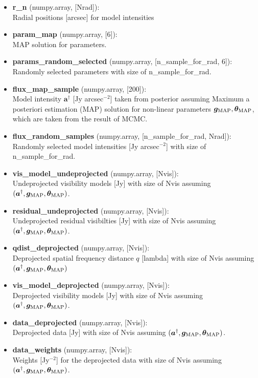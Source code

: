 \documentclass{report}
\begin{document}
\begin{itemize}
    \item \textbf{r\_n}  (numpy.array, [Nrad]): \\ 
    Radial positions  [arcsec] for model intensities 
    \item \textbf{param\_map} (numpy.array, [6]): \\ 
    MAP solution for parameters.
    \item \textbf{params\_random\_selected} (numpy.array, [n\_sample\_for\_rad, 6]): \\ 
    Randomly selected parameters with size of n\_sample\_for\_rad.
    \item \textbf{flux\_map\_sample} (numpy.array, [200]): \\ 
    Model intensity $\bm{a}^{\dagger}$  [Jy arcsec$^{-2}$]  taken from posterior assuming Maximum a posteriori estimation (MAP) solution for non-linear parameters $\bm{g}_{\rm MAP}, \bm{\theta}_{\rm MAP}$, which are taken from the result of MCMC. 
    \item \textbf{flux\_random\_samples} (numpy.array, [n\_sample\_for\_rad, Nrad]): \\ 
    Randomly selected model intensities [Jy arcsec$^{-2}$] with size of n\_sample\_for\_rad.
    \item \textbf{vis\_model\_undeprojected} (numpy.array, [Nvis]): \\ 
    Undeprojected visibility models [Jy] with size of Nvis assuming $(\bm{a}^{\dagger}, \bm{g}_{\rm MAP}, \bm{\theta}_{\rm MAP})$.
    \item \textbf{residual\_undeprojected} (numpy.array, [Nvis]): \\ 
    Undeprojected residual visibilties  [Jy] with size of Nvis   assuming $(\bm{a}^{\dagger}, \bm{g}_{\rm MAP}, \bm{\theta}_{\rm MAP})$.
    \item \textbf{qdist\_deprojected} (numpy.array, [Nvis]): \\ 
    Deprojected spatial frequency distance $q$ [lambda] with size of Nvis  assuming $(\bm{a}^{\dagger}, \bm{g}_{\rm MAP}, \bm{\theta}_{\rm MAP})$
    \item \textbf{vis\_model\_deprojected} (numpy.array, [Nvis]): \\ 
    Deprojected visibility models [Jy] with size of Nvis  assuming $(\bm{a}^{\dagger}, \bm{g}_{\rm MAP}, \bm{\theta}_{\rm MAP})$. 
    \item \textbf{data\_deprojected} (numpy.array, [Nvis]): \\ 
    Deprojected data  [Jy] with size of Nvis assuming $(\bm{a}^{\dagger}, \bm{g}_{\rm MAP}, \bm{\theta}_{\rm MAP})$. 
    \item \textbf{data\_weights} (numpy.array, [Nvis]): \\ 
    Weights  [Jy$^{-2}$] for the deprojected data with size of Nvis  assuming $(\bm{a}^{\dagger}, \bm{g}_{\rm MAP}, \bm{\theta}_{\rm MAP})$. 
\end{itemize}
    
\end{document}

